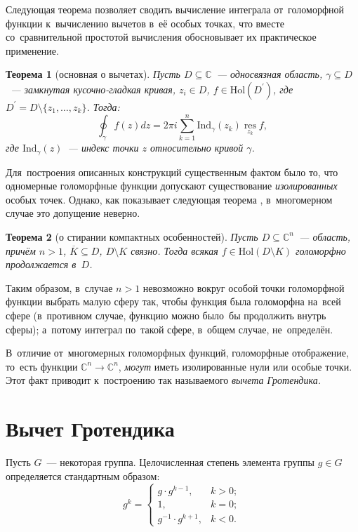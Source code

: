 \documentclass{article}
\newtheorem*{theorem*}{Теорема}
\begin{document}
Следующая теорема позволяет сводить вычисление интеграла от~голоморфной функции к~вычислению вычетов в~её особых точках,
что вместе со~сравнительной простотой вычисления обосновывает их практическое применение.
\begin{theorem*}[основная о вычетах]
  Пусть $D \subseteq \mathbb{C}$~— односвязная область, $\gamma \subseteq D$~— замкнутая кусочно-гладкая кривая,
  $z_i \in D$, $f \in \mathrm{Hol}(D^\prime)$, где $D^\prime = D \setminus \{ z_1, \ldots, z_k \}$.
  Тогда:
  $$
    \oint_{\gamma} f(z)dz = 2 \pi i \sum_{k = 1}^{n} \mathrm{Ind}_{\gamma}(z_k) \operatorname*{res}\limits_{z_k} f,
  $$
  где $\mathrm{Ind}_{\gamma}(z)$~— индекс точки $z$ относительно кривой $\gamma$.
\end{theorem*}

Для~построения описанных конструкций существенным фактом было то, что одномерные голоморфные функции допускают
существование \textit{изолированных} особых точек. Однако, как показывает следующая теорема \cite{ShaII}, в~многомерном случае
это допущение неверно.

\begin{theorem*}[о стирании компактных особенностей]
  Пусть $D \subseteq \mathbb{C}^n$~— область, причём $n > 1$, $\overline{K} \subseteq D$,
  $D \setminus K$ связно. Тогда всякая $f \in \mathrm{Hol}(D \setminus K)$
  голоморфно продолжается в~$D$.
\end{theorem*}

Таким образом, в~случае $n > 1$ невозможно вокруг особой точки голоморфной функции
выбрать малую сферу так, чтобы функция была голоморфна на~всей сфере (в~противном случае,
функцию можно было~бы продолжить внутрь сферы); а~потому интеграл по~такой сфере, в~общем случае, не~определён.

В~отличие от~многомерных голоморфных функций, голоморфные отображение, то~есть функции $\mathbb{C}^n \rightarrow \mathbb{C}^n$,
\textit{могут} иметь изолированные нули или особые точки. Этот факт приводит к~построению так называемого \textit{вычета Гротендика.}

\section{Вычет Гротендика}

Пусть $G$~— некоторая группа. Целочисленная степень элемента группы $g \in G$ определяется стандартным образом:
$$
  g^k =
  \begin{cases}
    g \cdot g^{k - 1}, & k > 0; \\
    1, & k = 0; \\
    g^{-1} \cdot g^{k + 1}, & k < 0.
  \end{cases}
$$
\end{document}

